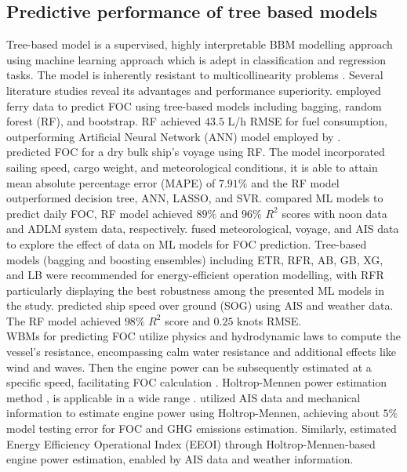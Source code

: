\documentclass[]{interact}
\theoremstyle{plain}%
\theoremstyle{definition}
\theoremstyle{remark}
\begin{document}
\subsection{Predictive performance of tree based models}\label{sec:perf_tree_litreview}

Tree-based model is a supervised, highly interpretable BBM modelling approach using machine learning approach which is adept in classification and regression tasks. The model is inherently resistant to multicollinearity problems \citep{Yan.2021}.  Several literature studies reveal its advantages and performance superiority. \citet{Soner.2018} employed ferry data to predict FOC using tree-based models including bagging, random forest (RF), and bootstrap. RF achieved $43.5$ L/h RMSE for fuel consumption, outperforming Artificial Neural Network (ANN) model employed by \citet{Petersen.2012}.\\

\citet{Yan.2020} predicted FOC for a dry bulk ship's voyage using RF. The model incorporated sailing speed, cargo weight, and meteorological conditions, it is able to attain mean absolute percentage error (MAPE) of $7.91\%$ and the RF model outperformed decision tree, ANN, LASSO, and SVR. \citet{Gkerekos.2019} compared ML models to predict daily FOC, RF model achieved $89\%$ and $96\%$ $R^2$ scores with noon data and ADLM system data, respectively. \citet{Li.2022} fused meteorological, voyage, and AIS data to explore the effect of data on ML models for FOC prediction. Tree-based models (bagging and boosting ensembles) including ETR, RFR, AB, GB, XG, and LB were recommended for energy-efficient operation modelling, with RFR particularly displaying the best robustness among the presented ML models in the study. \citet{Abebe.2020} predicted ship speed over ground (SOG) using AIS and weather data. The RF model achieved $98\%$ $R^2$ score and $0.25$ knots RMSE.\\

WBMs for predicting FOC utilize physics and hydrodynamic laws to compute the vessel's resistance, encompassing calm water resistance and additional effects like wind and waves. Then the engine power can be subsequently estimated at a specific speed, facilitating FOC calculation \citep{haranen2016white}. Holtrop-Mennen power estimation method \citet{Holtrop.1984}, is applicable in a wide range \citep{Rakke.2016,Kim.2020b}. \citet{Rakke.2016} utilized AIS data and mechanical information to estimate engine power using Holtrop-Mennen, achieving about $5\%$ model testing error for FOC and GHG emissions estimation. Similarly, \citet{Kim.2020b} estimated Energy Efficiency Operational Index (EEOI) through Holtrop-Mennen-based engine power estimation, enabled by AIS data and weather information.\\
\end{document}
